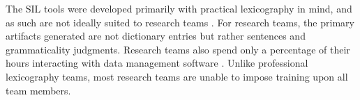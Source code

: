 \documentclass[11pt]{article}
\newcommand{\smalltodo}[2][]
    {\todo[caption={#2}, #1]
    {\tiny#2\normalsize}}
\begin{document}
The SIL tools were developed primarily with practical 
lexicography in mind, and as such are not ideally suited to research teams
. For research teams, the primary
artifacts generated are not dictionary entries but rather sentences and
grammaticality judgments.  Research teams also spend only a percentage of their
hours interacting with data management software \cite{Butler:2007,rogers10,robinson07}. Unlike professional
lexicography teams, most research teams are unable to impose training upon all
team members.%

 
\end{document}
